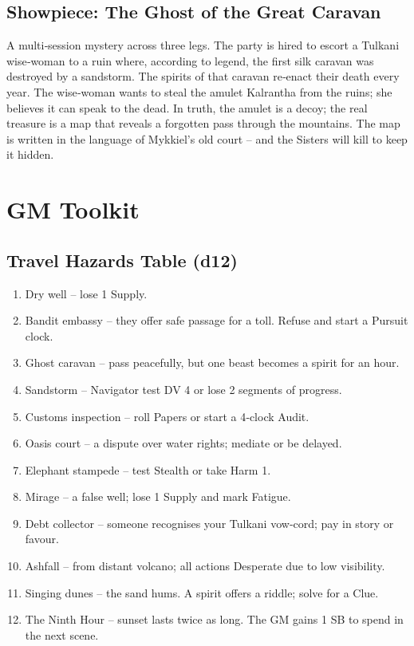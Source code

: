 \documentclass[11pt]{book}
\begin{document}
\section{Showpiece: The Ghost of the Great Caravan}
A multi‑session mystery across three legs. The party is hired to escort a Tulkani wise‑woman to a ruin where, according to legend, the first silk caravan was destroyed by a sandstorm. The spirits of that caravan re‑enact their death every year. The wise‑woman wants to steal the amulet Kalrantha from the ruins; she believes it can speak to the dead. In truth, the amulet is a decoy; the real treasure is a map that reveals a forgotten pass through the mountains. The map is written in the language of Mykkiel’s old court – and the Sisters will kill to keep it hidden.

\clearpage
\chapter{GM Toolkit}

\section{Travel Hazards Table (d12)}
\begin{enumerate}
    \item Dry well – lose 1 Supply.
    \item Bandit embassy – they offer safe passage for a toll. Refuse and start a Pursuit clock.
    \item Ghost caravan – pass peacefully, but one beast becomes a spirit for an hour.
    \item Sandstorm – Navigator test DV 4 or lose 2 segments of progress.
    \item Customs inspection – roll Papers or start a 4‑clock Audit.
    \item Oasis court – a dispute over water rights; mediate or be delayed.
    \item Elephant stampede – test Stealth or take Harm 1.
    \item Mirage – a false well; lose 1 Supply and mark Fatigue.
    \item Debt collector – someone recognises your Tulkani vow‑cord; pay in story or favour.
    \item Ashfall – from distant volcano; all actions Desperate due to low visibility.
    \item Singing dunes – the sand hums. A spirit offers a riddle; solve for a Clue.
    \item The Ninth Hour – sunset lasts twice as long. The GM gains 1 SB to spend in the next scene.
\end{enumerate}
\end{document}
